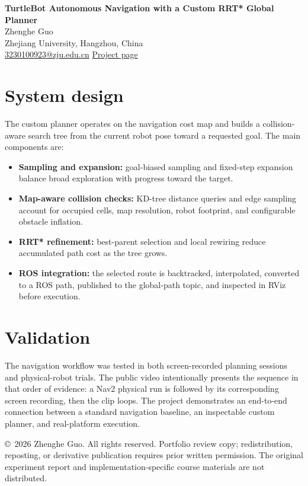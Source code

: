 \documentclass[10pt,letterpaper]{article}
\begin{document}
\begin{center}
{\LARGE\bfseries TurtleBot Autonomous Navigation with a Custom RRT* Global Planner}\\[7pt]
{\large Zhenghe Guo}\\[2pt]
Zhejiang University, Hangzhou, China\\[2pt]
\href{mailto:3230100923@zju.edu.cn}{3230100923@zju.edu.cn} \quad
\href{https://styokuok.github.io/main/projects/turtlebot-navigation/}{Project page}
\end{center}

\begin{abstract}
This project develops and evaluates an autonomous-navigation workflow for a physical TurtleBot using ROS and Nav2. A standard Nav2 planner provides the system baseline, while a custom RRT* global planner exposes the planning logic needed to study sampling, collision checking, rewiring, and path publication. The implementation connects map-aware planning to RViz inspection and real-robot execution. This public brief describes the system and demonstrated functionality without reproducing the original course report.
\end{abstract}

\section*{System design}
The custom planner operates on the navigation cost map and builds a collision-aware search tree from the current robot pose toward a requested goal. The main components are:
\begin{itemize}
  \item \textbf{Sampling and expansion:} goal-biased sampling and fixed-step expansion balance broad exploration with progress toward the target.
  \item \textbf{Map-aware collision checks:} KD-tree distance queries and edge sampling account for occupied cells, map resolution, robot footprint, and configurable obstacle inflation.
  \item \textbf{RRT* refinement:} best-parent selection and local rewiring reduce accumulated path cost as the tree grows.
  \item \textbf{ROS integration:} the selected route is backtracked, interpolated, converted to a ROS path, published to the global-path topic, and inspected in RViz before execution.
\end{itemize}

\section*{Validation}
The navigation workflow was tested in both screen-recorded planning sessions and physical-robot trials. The public video intentionally presents the sequence in that order of evidence: a Nav2 physical run is followed by its corresponding screen recording, then the clip loops. The project demonstrates an end-to-end connection between a standard navigation baseline, an inspectable custom planner, and real-platform execution.

\vfill
{\footnotesize \copyright\ 2026 Zhenghe Guo. All rights reserved. Portfolio review copy; redistribution, reposting, or derivative publication requires prior written permission. The original experiment report and implementation-specific course materials are not distributed.}
\end{document}
